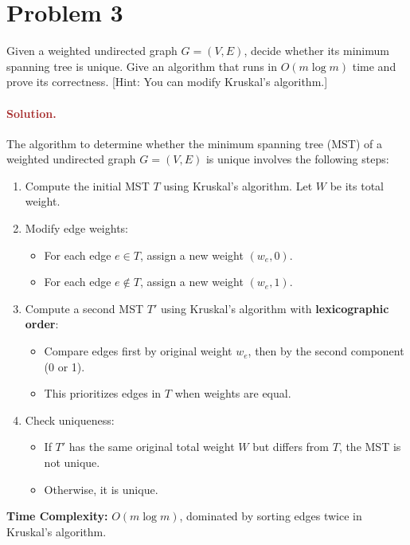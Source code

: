 \section*{Problem 3}
Given a weighted undirected graph $G = (V, E)$, decide whether its minimum spanning tree is unique. Give an algorithm that runs in $O(m \log m)$ time and prove its correctness. [Hint: You can modify Kruskal's algorithm.]


\paragraph{\textcolor{brown}{Solution.}}
The algorithm to determine whether the minimum spanning tree (MST) of a weighted undirected graph \( G = (V, E) \) is unique involves the following steps:
\begin{enumerate}
    \item Compute the initial MST \( T \) using Kruskal's algorithm. Let \( W \) be its total weight.
    \item Modify edge weights:
    \begin{itemize}
        \item For each edge \( e \in T \), assign a new weight \( (w_e, 0) \).
        \item For each edge \( e \notin T \), assign a new weight \( (w_e, 1) \).
    \end{itemize}
    \item Compute a second MST \( T' \) using Kruskal's algorithm with \textbf{lexicographic order}:
    \begin{itemize}
        \item Compare edges first by original weight \( w_e \), then by the second component (0 or 1).
        \item This prioritizes edges in \( T \) when weights are equal.
    \end{itemize}
    \item Check uniqueness:
    \begin{itemize}
        \item If \( T' \) has the same original total weight \( W \) but differs from \( T \), the MST is not unique.
        \item Otherwise, it is unique.
    \end{itemize}
\end{enumerate}

\textbf{Time Complexity:} \( O(m \log m) \), dominated by sorting edges twice in Kruskal's algorithm.


